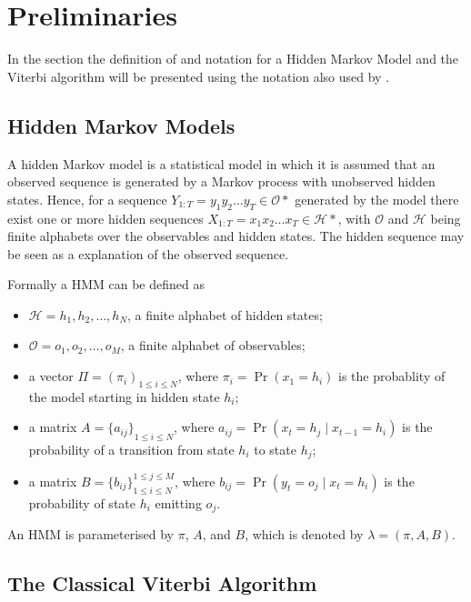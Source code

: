 \chapter{Preliminaries}
\label{cha:preliminaries}

In the section the definition of and notation for a Hidden Markov Model and the
Viterbi algorithm will be presented using the notation also used by
\citet{sand2013ziphmmlib}.

\section{Hidden Markov Models}
\label{sec:hidden-markov-models}

A hidden Markov model is a statistical model in which it is assumed that an
observed sequence is generated by a Markov process with unobserved hidden
states. Hence, for a sequence $Y_{1:T} = y_1y_2\dots{}y_T \in \mathcal{O*}$
generated by the model there exist one or more hidden sequences
$X_{1:T} = x_1x_2\dots{}x_T \in \mathcal{H*}$, with $\mathcal{O}$ and
$\mathcal{H}$ being finite alphabets over the observables and hidden
states. The hidden sequence may be seen as a explanation of the observed
sequence.

Formally a HMM can be defined as
\begin{itemize}
\item $\mathcal{H} = {h_1, h_2, \dots, h_N}$, a finite alphabet of hidden
  states;
\item $\mathcal{O} = {o_1, o_2, \dots, o_M}$, a finite alphabet of observables;
\item a vector $\Pi = {(\pi_i)}_{1 \le i \le N}$, where $\pi_i = \Pr(x_1 =
  h_i)$ is the probablity of the model starting in hidden state $h_i$;
\item a matrix $A = {\{a_{ij}\}}_{1 \le i \le N}$, where $a_{ij} = \Pr(x_t
  = h_j \mid x_{t - 1} = h_i)$ is the probability of a transition from state
  $h_i$ to state $h_j$;
\item a matrix $B = {\{b_{ij}\}}_{1 \le i \le N}^{1 \le j \le M}$, where
  $b_{ij} = \Pr(y_t = o_j \mid x_t = h_i)$ is the probability of state
  $h_i$ emitting $o_j$.
\end{itemize}

An HMM is parameterised by $\pi$, $A$, and $B$, which is denoted by $\lambda =
(\pi, A, B)$.

\section{The Classical Viterbi Algorithm}
\label{sec:class-viterbi-algor}

